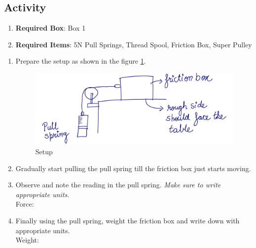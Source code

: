 \documentclass[10pt]{article}
\begin{document}
\subsection{Activity}
\begin{enumerate}
\item \textbf{Required Box}: Box 1
\item \textbf{Required Items}: 5N Pull Springs, Thread Spool, Friction Box, Super Pulley
\end{enumerate}
\begin{enumerate}
\item Prepare the setup as shown in the figure \ref{pulleyfri}.
\begin{figure}[h]
\label{pulleyfri}
\includegraphics[scale=.5]{pulleyfric}
\centering
\caption{Setup}
\end{figure}
\item Gradually start pulling the pull spring till the friction box just starts moving.
\item Observe and note the reading in the pull spring.  \emph{Make sure to write appropriate units.}\\
Force:\underline{\hspace{5cm}}
\item Finally using the pull spring, weight the friction box and write down with appropriate units.\\  Weight:\underline{\hspace{5cm}}
\end{enumerate}
\end{document}
